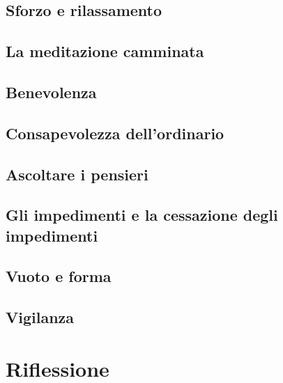 \documentclass[11pt,twoside,final]{memoir}
\begin{document}
\chapter{Sforzo e rilassamento}


\chapter{La meditazione camminata}


\chapter{Benevolenza}


\chapter{Consapevolezza dell'ordinario}


\chapter{Ascoltare i pensieri}


\chapter{Gli impedimenti e la cessazione degli impedimenti}


\chapter{Vuoto e forma}


\chapter{Vigilanza}



\part{Riflessione}
\end{document}
